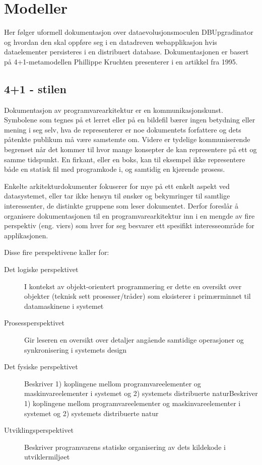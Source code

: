 \section{Modeller}

Her følger uformell dokumentasjon over dataevolusjonsmoculen DBUpgradinator og hvordan den skal oppføre seg i en datadreven webapplikasjon hvis dataelementer persisteres i en distribuert database. Dokumentasjonen er basert på 4+1-metamodellen Phillippe Kruchten presenterer i en artikkel fra 1995.

\subsection{4+1 - stilen}

Dokumentasjon av programvarearkitektur er en kommunikasjonskunst. Symbolene som tegnes på et lerret eller på en bildefil bærer ingen betydning eller mening i seg selv, hva de representerer er noe dokumentets forfattere og dets påtenkte publikum må være samstemte om. Videre er tydelige kommuniserende begrenset når det kommer til hvor mange konsepter de kan representere på ett og samme tidspunkt. En firkant, eller en boks, kan til eksempel ikke representere både en statisk fil med programkode i, og samtidig en kjørende prosess.

Enkelte arkitekturdokumenter fokuserer for mye på ett enkelt aspekt ved datasystemet, eller tar ikke hensyn til ønsker og bekymringer til samtlige interessenter, de distinkte gruppene som leser dokumentet. Derfor foreslår \cite{kruchten1995} å organisere dokumentasjonen til en programvarearkitektur inn i en mengde av fire perspektiv (eng. viers) som hver for seg besvarer ett spesifikt interesseområde for applikasjonen.

Disse fire perspektivene kaller \cite{kruchten1995} for:
\begin{description}
  \item [Det logiske perspektivet] I kontekst av objekt-orientert programmering er dette en oversikt over objekter (teknisk sett prosesser/tråder) som eksisterer i primærminnet til datamaskinene i systemet
  \item [Prosessperspektivet] Gir leseren en oversikt over detaljer angående samtidige operasjoner og synkronisering i systemets design
  \item [Det fysiske perspektivet] Beskriver 1) koplingene mellom programvareelementer og maskinvareelementer i systemet og 2) systemets distribuerte naturBeskriver 1) koplingene mellom programvareelementer og maskinvareelementer i systemet og 2) systemets distribuerte natur
  \item [Utviklingsperspektivet] Beskriver programvarens statiske organisering av dets kildekode i utviklermiljøet
\end{description}

